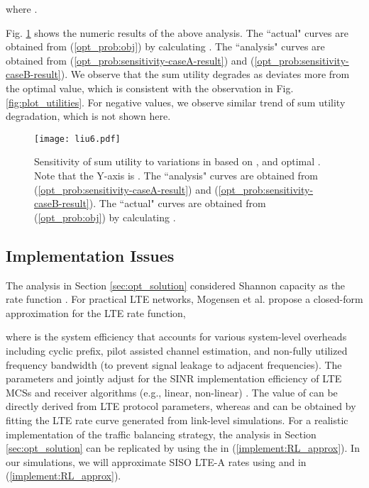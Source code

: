 \documentclass[journal,final,letterpaper,10pt,doublecolumn,twoside]{IEEEtran}
\begin{document}
where  .



Fig. \ref{fig:sensitivity} shows the numeric results of the above analysis. The ``actual" curves are obtained from (\ref{opt_prob:obj}) by calculating . The ``analysis" curves are obtained from (\ref{opt_prob:sensitivity-caseA-result}) and (\ref{opt_prob:sensitivity-caseB-result}). We observe that the sum utility degrades as  deviates more from the optimal value, which is consistent with the observation in Fig. \ref{fig:plot_utilities}.
For negative  values, we observe similar trend of sum utility degradation, which is not shown here.

\begin{figure}
  \center
  \texttt{[image: liu6.pdf]}
  \caption{ Sensitivity of sum utility to variations in  based on ,  and optimal . Note that the Y-axis is .  The ``analysis" curves are obtained from (\ref{opt_prob:sensitivity-caseA-result}) and (\ref{opt_prob:sensitivity-caseB-result}).   The ``actual" curves are obtained from (\ref{opt_prob:obj}) by calculating .  } \label{fig:sensitivity}
\end{figure}




\subsection{Implementation Issues} \label{subsec:Traffic-assign-Implementation}

The analysis in Section \ref{sec:opt_solution} considered  Shannon capacity as the rate function . For practical LTE networks, Mogensen et al. \cite{LteRateApprox} propose a closed-form approximation for the LTE rate function,

where  is the system efficiency that accounts for various system-level overheads including cyclic prefix,
pilot assisted channel estimation, and non-fully utilized frequency bandwidth (to prevent signal leakage to adjacent frequencies). The parameters  and  jointly adjust for the SINR implementation efficiency of LTE MCSs and receiver algorithms (e.g., linear, non-linear) \cite{LteRateApprox}. The value of  can be directly derived from LTE protocol parameters, whereas  and  can be obtained by fitting the LTE rate curve generated from link-level simulations. For a realistic implementation of the traffic balancing strategy, the analysis in Section \ref{sec:opt_solution} can be replicated by using the   in (\ref{implement:RL_approx}). In our simulations, we will approximate SISO LTE-A rates using  and  in (\ref{implement:RL_approx}).
\end{document}

